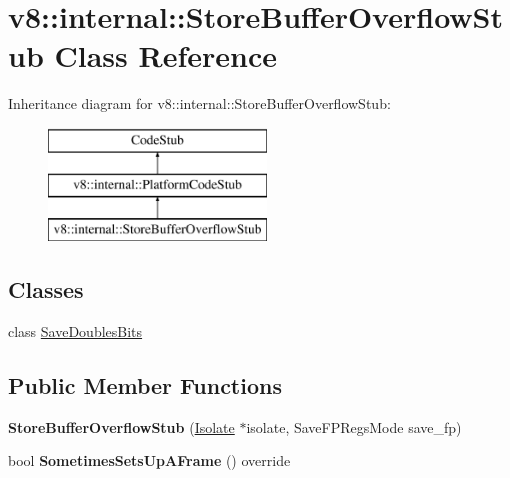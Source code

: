 \hypertarget{classv8_1_1internal_1_1_store_buffer_overflow_stub}{}\section{v8\+:\+:internal\+:\+:Store\+Buffer\+Overflow\+Stub Class Reference}
\label{classv8_1_1internal_1_1_store_buffer_overflow_stub}
Inheritance diagram for v8\+:\+:internal\+:\+:Store\+Buffer\+Overflow\+Stub\+:\begin{figure}[H]
\begin{center}
\leavevmode
\includegraphics[height=3.000000cm]{classv8_1_1internal_1_1_store_buffer_overflow_stub}
\end{center}
\end{figure}
\subsection*{Classes}
\begin{DoxyCompactItemize}
\item 
class \hyperlink{classv8_1_1internal_1_1_store_buffer_overflow_stub_1_1_save_doubles_bits}{Save\+Doubles\+Bits}
\end{DoxyCompactItemize}
\subsection*{Public Member Functions}
\begin{DoxyCompactItemize}
\item 
{\bfseries Store\+Buffer\+Overflow\+Stub} (\hyperlink{classv8_1_1internal_1_1_isolate}{Isolate} $\ast$isolate, Save\+F\+P\+Regs\+Mode save\+\_\+fp)\hypertarget{classv8_1_1internal_1_1_store_buffer_overflow_stub_a0c574a3802eb5f57f3d9f5aec375fd10}{}\label{classv8_1_1internal_1_1_store_buffer_overflow_stub_a0c574a3802eb5f57f3d9f5aec375fd10}

\item 
bool {\bfseries Sometimes\+Sets\+Up\+A\+Frame} () override\hypertarget{classv8_1_1internal_1_1_store_buffer_overflow_stub_a1f216c81c6ac084f426125354a02cacd}{}\label{classv8_1_1internal_1_1_store_buffer_overflow_stub_a1f216c81c6ac084f426125354a02cacd}

\end{DoxyCompactItemize}
